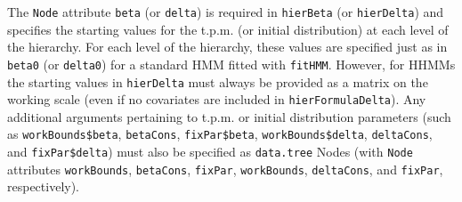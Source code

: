 \documentclass[12pt]{article}\usepackage[]{graphicx}\usepackage[]{xcolor}
\begin{document}
\noindent The \verb|Node| attribute \verb|beta| (or \verb|delta|) is required in \verb|hierBeta| (or \verb|hierDelta|) and specifies the starting values for the t.p.m. (or initial distribution) at each level of the hierarchy. For each level of the hierarchy, these values are specified just as in \verb|beta0| (or \verb|delta0|) for a standard HMM fitted with \verb|fitHMM|. However, for HHMMs the starting values in \verb|hierDelta| must always be provided as a matrix on the working scale (even if no covariates are included in \verb|hierFormulaDelta|). Any additional arguments pertaining to t.p.m. or initial distribution parameters (such as \verb|workBounds$beta|, \verb|betaCons|, \verb|fixPar$beta|, \verb|workBounds$delta|, \verb|deltaCons|, and \verb|fixPar$delta|) must also be specified as \verb|data.tree| Nodes (with \verb|Node| attributes \verb|workBounds|, \verb|betaCons|, \verb|fixPar|, \verb|workBounds|, \verb|deltaCons|, and \verb|fixPar|, respectively).
\end{document}
